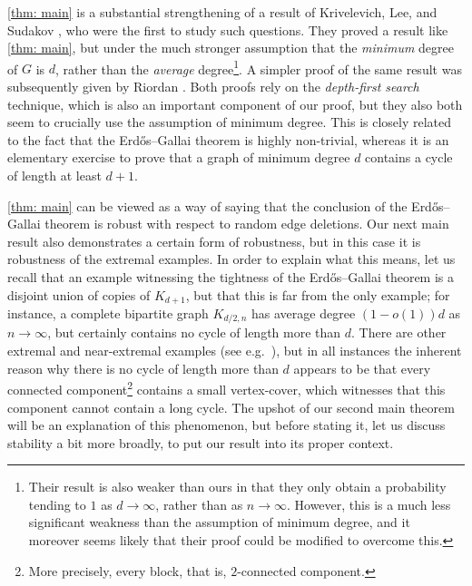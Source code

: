 \documentclass[10pt]{article}
\theoremstyle{definition}
\begin{document}
\cref{thm: main} is a substantial strengthening of a result of 
Krivelevich, Lee, and Sudakov \cite{MR3302900}, who were the first to study such questions. They proved a result like \cref{thm: main}, but under the much stronger assumption that the \emph{minimum} degree of $G$ is $d$, rather than the \emph{average} degree\footnote{Their result is also weaker than ours in that they only obtain a probability tending to $1$ as $d \to \infty$, rather than as $n \to \infty$. However, this is a much less significant weakness than the assumption of minimum degree, and it moreover seems likely that their proof could be modified to overcome this.}. A simpler proof of the same result was subsequently given by Riordan \cite{MR3275705}. Both proofs rely on the \emph{depth-first search} technique, which is also an important component of our proof, but they also both seem to crucially use the assumption of minimum degree. This is closely related to the fact that the Erd\H os--Gallai theorem is highly non-trivial, whereas it is an elementary exercise to prove that a graph of minimum degree $d$ contains a cycle of length at least $d+1$. 

\cref{thm: main} can be viewed as a way of saying that the conclusion of the Erd\H os--Gallai theorem is robust with respect to random edge deletions. Our next main result also demonstrates a certain form of robustness, but in this case it is robustness of the extremal examples. In order to explain what this means, let us recall that an example witnessing the tightness of the Erd\H os--Gallai theorem is a disjoint union of copies of $K_{d+1}$, but that this is far from the only example; for instance, a complete bipartite graph $K_{d/2,n}$ has average degree $(1-o(1))d$ as $n \to \infty$, but certainly contains no cycle of length more than $d$. There are other extremal and near-extremal examples (see e.g.\ \cite[Construction 5.3]{MR3203598}), but in all instances the inherent reason why there is no cycle of length more than $d$ appears to be that every connected component\footnote{More precisely, every block, that is, $2$-connected component.} contains a small vertex-cover, which witnesses that this component cannot contain a long cycle. The upshot of our second main theorem will be an explanation of this phenomenon, but before stating it, let us discuss stability a bit more broadly, to put our result into its proper context.
\end{document}
